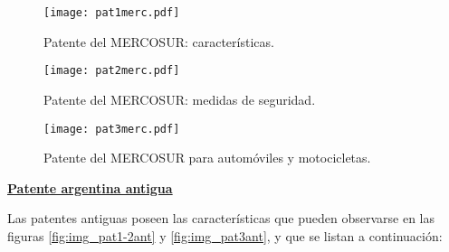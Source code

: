 \begin{figure}[H]
	\centering
	\texttt{[image: pat1merc.pdf]}
	\caption{Patente del MERCOSUR: características.}
	\label{fig:img_pat1}

	\quad

	\centering
	\texttt{[image: pat2merc.pdf]}
	\caption{Patente del MERCOSUR: medidas de seguridad.}
	\label{fig:img_pat2}
	
	\quad
	
	\texttt{[image: pat3merc.pdf]}
	\caption{Patente del MERCOSUR para automóviles y motocicletas.}
	\label{fig:img_pat3}
\end{figure}

\noindent \underline{\textbf{Patente argentina antigua}}

Las patentes antiguas poseen las características que pueden observarse en las figuras \ref{fig:img_pat1-2ant} y \ref{fig:img_pat3ant}, y que se listan a continuación: 

